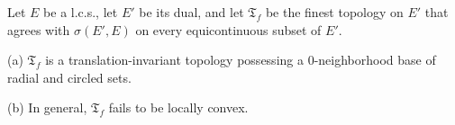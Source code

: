 Let $E$ be a l.c.s., let $E'$ be its dual, and let $\mathfrak{T}_f$ be the finest topology on $E'$ that agrees with $\sigma(E', E)$ on every equicontinuous subset of $E'$.

(a) $\mathfrak{T}_f$ is a translation-invariant topology possessing a 0-neighborhood base of radial and circled sets.

(b) In general, $\mathfrak{T}_f$ fails to be locally convex.
